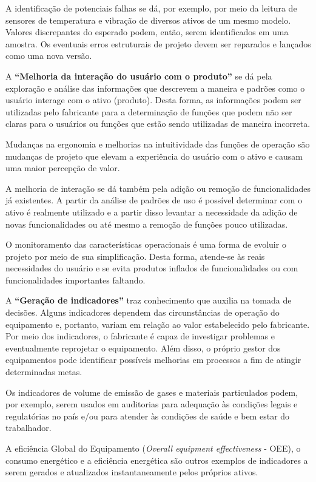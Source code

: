 A identificação de potenciais falhas se dá, por exemplo, por meio da leitura de sensores de temperatura e vibração de diversos ativos de um mesmo modelo. Valores discrepantes do esperado podem, então, serem identificados em uma amostra. Os eventuais erros estruturais de projeto devem ser reparados e lançados como uma nova versão.

A \textbf{``Melhoria da interação do usuário com o produto''} se dá pela exploração e análise das informações que descrevem a maneira e padrões como o usuário interage com o ativo (produto). Desta forma, as informações podem ser utilizadas pelo fabricante para a determinação de funções que podem não ser claras para o usuários ou funções que estão sendo utilizadas de maneira incorreta.

Mudanças na ergonomia e melhorias na intuitividade das funções de operação são mudanças de projeto que elevam a experiência do usuário com o ativo e causam uma maior percepção de valor.

A melhoria de interação se dá também pela adição ou remoção de funcionalidades já existentes. A partir da análise de padrões de uso é possível determinar com o ativo é realmente utilizado e a partir disso levantar a necessidade da adição de novas funcionalidades ou até mesmo a remoção de funções pouco utilizadas.

O monitoramento das características operacionais é uma forma de evoluir o projeto por meio de sua simplificação. Desta forma, atende-se às reais necessidades do usuário e se evita produtos inflados de funcionalidades ou com funcionalidades importantes faltando.

A \textbf{``Geração de indicadores''} traz conhecimento que auxilia na tomada de decisões. Alguns indicadores dependem das circunstâncias de operação do equipamento e, portanto, variam em relação ao valor estabelecido pelo fabricante. Por meio dos indicadores, o fabricante é capaz de investigar problemas e eventualmente reprojetar o equipamento. Além disso, o próprio gestor dos equipamentos pode identificar possíveis melhorias em processos a fim de atingir determinadas metas.

Os indicadores de volume de emissão de gases e materiais particulados podem, por exemplo, serem usados em auditorias para adequação às condições legais e regulatórias no país e/ou para atender às condições de saúde e bem estar do trabalhador.

A eficiência Global do Equipamento (\textit{Overall equipment effectiveness} - OEE), o consumo energético e a eficiência energética são outros exemplos de indicadores a serem gerados e atualizados instantaneamente pelos próprios ativos.

